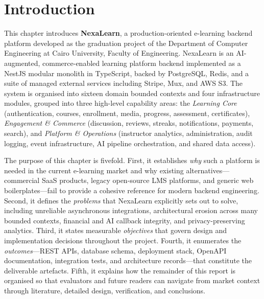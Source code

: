 
\chapter{Introduction}
\label{ch:introduction}

This chapter introduces \textbf{NexaLearn}, a production-oriented e-learning backend platform developed as the graduation project of the Department of Computer Engineering at Cairo University, Faculty of Engineering. NexaLearn is an AI-augmented, commerce-enabled learning platform backend implemented as a NestJS modular monolith in TypeScript, backed by PostgreSQL, Redis, and a suite of managed external services including Stripe, Mux, and AWS S3. The system is organised into sixteen domain bounded contexts and four infrastructure modules, grouped into three high-level capability areas: the \emph{Learning Core} (authentication, courses, enrollment, media, progress, assessment, certificates), \emph{Engagement \& Commerce} (discussion, reviews, streaks, notifications, payments, search), and \emph{Platform \& Operations} (instructor analytics, administration, audit logging, event infrastructure, AI pipeline orchestration, and shared data access).

The purpose of this chapter is fivefold. First, it establishes \textit{why} such a platform is needed in the current e-learning market and why existing alternatives---commercial SaaS products, legacy open-source LMS platforms, and generic web boilerplates---fail to provide a cohesive reference for modern backend engineering. Second, it defines the \textit{problems} that NexaLearn explicitly sets out to solve, including unreliable asynchronous integrations, architectural erosion across many bounded contexts, financial and AI callback integrity, and privacy-preserving analytics. Third, it states measurable \textit{objectives} that govern design and implementation decisions throughout the project. Fourth, it enumerates the \textit{outcomes}---REST APIs, database schema, deployment stack, OpenAPI documentation, integration tests, and architecture records---that constitute the deliverable artefacts. Fifth, it explains how the remainder of this report is organised so that evaluators and future readers can navigate from market context through literature, detailed design, verification, and conclusions.

